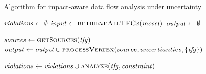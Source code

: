 \begin{algorithm}
    \caption{Algorithm for impact-aware data flow analysis under uncertainty}
    \label{alg:confidentialityanalysis:impactaware}
    \begin{algorithmic}[1]
            \algindentskip
            \State $\mathit{violations} \gets \emptyset$
            \State $\mathit{input} \gets \textsc{retrieveAllTFGs}(\mathit{model})$
            \State $\mathit{output} \gets \emptyset$
            \algblockskip

             
                \State $\mathit{sources} \gets \textsc{getSources}(\mathit{tfg})$ 
                    \State $\mathit{output} \gets \mathit{output} \cup \textsc{processVertex}(source, uncertianties, \{ \mathit{tfg} \})$\label{alg:confidentialityanalysis:impactaware:8}
                \EndFor
            \EndFor
            \algblockskip

             
                \State $\mathit{violations} \gets \mathit{violations} \cup \textsc{analyze}(\mathit{tfg}, \mathit{constraint})$\label{alg:confidentialityanalysis:impactaware:12}
            \EndFor
            \algblockskip

            \State {} \label{alg:confidentialityanalysis:impactaware:14}
            \algindentskip
        \EndProcedure   
    \end{algorithmic}
\end{algorithm}

